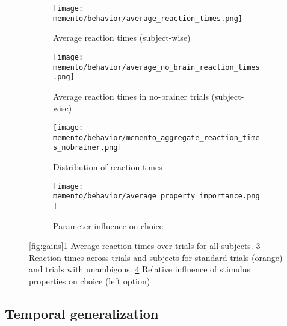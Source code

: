 \begin{figure}
	\centering
	\begin{subfigure}[t]{0.4\textwidth}
		\texttt{[image: memento/behavior/average\_reaction\_times.png]}
		\caption{Average reaction times (subject-wise)}
		\label{fig:avgreactions}
	\end{subfigure}
	\begin{subfigure}[t]{0.4\textwidth}
		\texttt{[image: memento/behavior/average\_no\_brain\_reaction\_times.png]}
		\caption{Average reaction times in no-brainer trials (subject-wise)}
		\label{fig:avgreactionsnobrain}
	\end{subfigure}
	\begin{subfigure}[t]{0.45\textwidth}
		\texttt{[image: memento/behavior/memento\_aggregate\_reaction\_times\_nobrainer.png]}
		\caption{Distribution of reaction times}
		\label{fig:reactiontimes}
	\end{subfigure}
	\begin{subfigure}[t]{0.45\textwidth}
		\texttt{[image: memento/behavior/average\_property\_importance.png]}
		\caption{Parameter influence on choice}
		\label{fig:logregbehavior}
	\end{subfigure}

	\caption[Behavioral results]{\ref{fig:gains}\ref{fig:avgreactions} Average reaction times over trials for all subjects. \ref{fig:reactiontimes} Reaction times across trials and subjects for standard trials (orange) and trials with unambigous. \ref{fig:logregbehavior} Relative influence of stimulus properties on choice (left option)}
	\label{fig:behav}
\end{figure}

\subsection{Temporal generalization}
\label{temporal-generalization-analysis}

